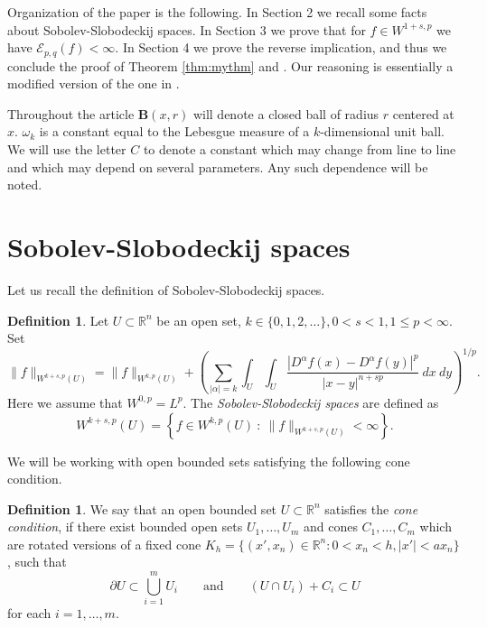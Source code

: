 \documentclass[11pt]{amsart}
\newcommand{\R}{\mathbb{R}}
\newcommand{\Epq}{\mathcal{E}_{p,q}}
\theoremstyle{definition}
\newtheorem{defi}[theorem]{Definition}
\begin{document}
	Organization of the paper is the following. In Section 2 we recall some facts about Sobolev-Slobodeckij spaces. In Section 3 we prove that for $f\in W^{1+s,p}$ we have $\Epq(f)<\infty$. In Section 4 we prove the reverse implication, and thus we conclude the proof of Theorem \ref{thm:mythm} and . Our reasoning is essentially a modified version of the one in \cite{blatt2012sharp}.
	
	Throughout the article $\textbf{B}(x,r)$ will denote a closed ball of radius $r$ centered at $x$. $\omega_k$ is a constant equal to the Lebesgue measure of a $k$-dimensional unit ball. We will use the letter $C$ to denote a constant which may change from line to line and which may depend on several parameters. Any such dependence will be noted.
\section{Sobolev-Slobodeckij spaces}	
	
	Let us recall the definition of Sobolev-Slobodeckij spaces.
	\begin{defi}
		Let $U\subset\R^n$ be an open set, $k\in\{0,1,2,\dots\}, 0<s<1, 1\leq p< \infty$. Set
		\begin{equation*}
		\lVert f\rVert_{W^{k+s,p}(U)} = \lVert f\rVert_{W^{k,p}(U)} + \left(\sum_{|\alpha|=k}\int_{U}\int_{U}\frac{|D^{\alpha}f(x)-D^{\alpha}f(y)|^p}{|x-y|^{n+sp}}\ dx\ dy \right)^{1/p}.
		\end{equation*}
		Here we assume that $W^{0,p} = L^p.$ The \emph{Sobolev-Slobodeckij spaces} are defined as
		\begin{equation*}
		W^{k+s,p}(U) = \left\{f\in W^{k,p}(U)\ :\ \lVert f\rVert_{W^{k+s,p}(U)}<\infty\right\}. 
		\end{equation*}
	\end{defi}
	
	We will be working with open bounded sets satisfying the following cone condition.
	
	\begin{defi}\label{def:cone_condition}
		We say that an open bounded set $U\subset\R^n$ satisfies the \emph{cone condition}, if there exist bounded open sets $U_1,\dots,U_m$ and cones $C_1,\dots,C_m$ which are rotated versions of a fixed cone $K_h=\{(x',x_n)\in\R^n:0<x_n<h,|x'|<ax_n\}$, such that
		\[\partial U\subset\bigcup_{i=1}^{m}U_i\qquad\mathrm{and}\qquad (U\cap U_i)+C_i\subset U\]
		for each $i=1,\dots,m$.
	\end{defi}
	
\end{document}
